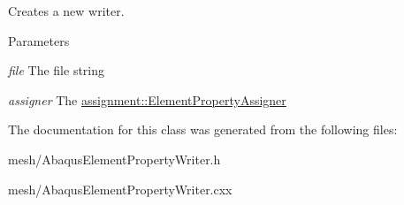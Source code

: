 Creates a new writer. 


\begin{DoxyParams}{Parameters}
\item[{\em file}]The file string \item[{\em assigner}]The \hyperlink{classassignment_1_1_element_property_assigner}{assignment::ElementPropertyAssigner} \end{DoxyParams}


The documentation for this class was generated from the following files:\begin{DoxyCompactItemize}
\item 
mesh/AbaqusElementPropertyWriter.h\item 
mesh/AbaqusElementPropertyWriter.cxx\end{DoxyCompactItemize}
